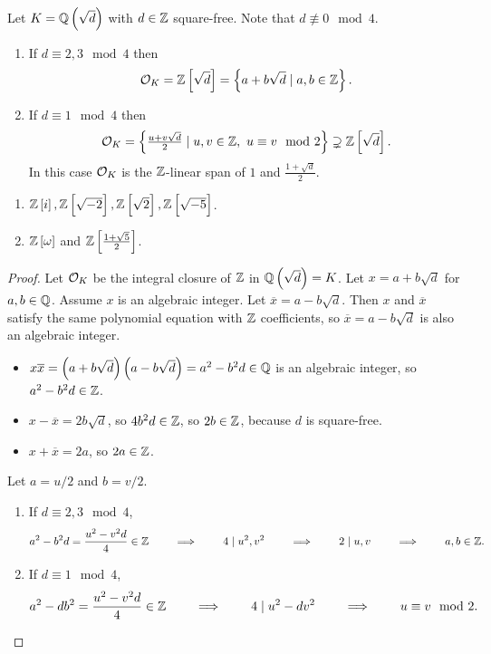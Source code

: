 \begin{theorem}
Let $ K = \Q\br{\sqrt{d}} $ with $ d \in \mathbb{Z} $ square-free. Note that $ d \not\equiv 0 \mod 4 $.
\begin{enumerate}
\item If $ d \equiv 2, 3 \mod 4 $ then
$$ \OO_K = \Z\sbr{\sqrt{d}} = \cbr{a + b\sqrt{d} \mid a, b \in \Z}. $$
\item If $ d \equiv 1 \mod 4 $ then
$$ \OO_K = \cbr{\tfrac{u + v\sqrt{d}}{2} \mid u, v \in \Z, \ u \equiv v \mod 2} \supsetneq \Z\sbr{\sqrt{d}}. $$
In this case $ \mathcal{O}_K $ is the $ \mathbb{Z} $-linear span of $ 1 $ and $ \tfrac{1 + \sqrt{d}}{2} $.
\end{enumerate}
\end{theorem}

\begin{example*}
\hfill
\begin{enumerate}
\item $ \Z\sbr{i}, \Z\sbr{\sqrt{-2}}, \Z\sbr{\sqrt{2}}, \Z\sbr{\sqrt{-5}} $.
\item $ \Z\sbr{\omega} $ and $ \Z\sbr{\tfrac{1 + \sqrt{5}}{2}} $.
\end{enumerate}
\end{example*}

\begin{proof}
Let $ \mathcal{O}_K $ be the integral closure of $ \mathbb{Z} $ in $ \Q\br{\sqrt{d}} = K $. Let $ x = a + b\sqrt{d} $ for $ a, b \in \mathbb{Q} $. Assume $ x $ is an algebraic integer. Let $ \overline{x} = a - b\sqrt{d} $. Then $ x $ and $ \overline{x} $ satisfy the same polynomial equation with $ \mathbb{Z} $ coefficients, so $ \overline{x} = a - b\sqrt{d} $ is also an algebraic integer.
\begin{itemize}
\item $ x\overline{x} = \br{a + b\sqrt{d}}\br{a - b\sqrt{d}} = a^2 - b^2d \in \Q $ is an algebraic integer, so $ a^2 - b^2d \in \mathbb{Z} $.
\item $ x - \overline{x} = 2b\sqrt{d} $, so $ 4b^2d \in \mathbb{Z} $, so $ 2b \in \mathbb{Z} $, because $ d $ is square-free.
\item $ x + \overline{x} = 2a $, so $ 2a \in \mathbb{Z} $.
\end{itemize}
Let $ a = u / 2 $ and $ b = v / 2 $.
\begin{enumerate}
\item If $ d \equiv 2, 3 \mod 4 $,
$$ a^2 - b^2d = \dfrac{u^2 - v^2d}{4} \in \mathbb{Z} \qquad \implies \qquad 4 \mid u^2, v^2 \qquad \implies \qquad 2 \mid u, v \qquad \implies \qquad a, b \in \mathbb{Z}. $$
\item If $ d \equiv 1 \mod 4 $,
$$ a^2 - db^2 = \dfrac{u^2 - v^2d}{4} \in \mathbb{Z} \qquad \implies \qquad 4 \mid u^2 - dv^2 \qquad \implies \qquad u \equiv v \mod 2. $$
\end{enumerate}
\end{proof}

